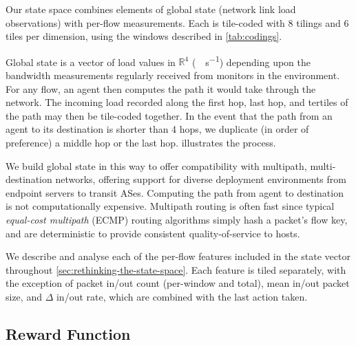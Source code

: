 \documentclass[10pt, times, conference, letterpaper]{IEEEtran}
\begin{document}
Our state space combines elements of global state (network link load observations) with per-flow measurements.
Each is tile-coded with 8 tilings and 6 tiles per dimension, using the windows described in \cref{tab:codings}.

Global state is a vector of load values in $\mathbb{R}^4$ (\si{\mega\bit\per\second}) depending upon the bandwidth measurements regularly received from monitors in the environment.
For any flow, an agent then computes the path it would take through the network.
The incoming load recorded along the first hop, last hop, and tertiles of the path may then be tile-coded together.
In the event that the path from an agent to its destination is shorter than 4 hops, we duplicate (in order of preference) a middle hop or the last hop.
 illustrates the process.

We build global state in this way to offer compatibility with multipath, multi-destination networks, offering support for diverse deployment environments from endpoint servers to transit ASes.
Computing the path from agent to destination is not computationally expensive.
Multipath routing is often fast since typical \emph{equal-cost multipath} (ECMP) routing algorithms simply hash a packet's flow key, and are deterministic to provide consistent quality-of-service to hosts.


We describe and analyse each of the per-flow features included in the state vector throughout \cref{sec:rethinking-the-state-space}.
Each feature is tiled separately, with the exception of packet in/out count (per-window and total), mean in/out packet size, and $\Delta$ in/out rate, which are combined with the last action taken.

\subsection{Reward Function}

%
\end{document}
